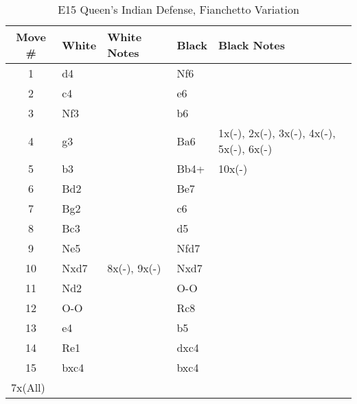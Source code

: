 \begin{table}[htbp]
\centering
\scriptsize
\caption[]{E15 Queen's Indian Defense, Fianchetto Variation}
\begin{tabular}{|c|l|p{5cm}|l|p{5cm}|}
\hline
\textbf{Move \#} & \textbf{White} & \textbf{White Notes} & \textbf{Black} & \textbf{Black Notes} \\
\hline
1  & d4    &         & Nf6   &         \\
2  & c4    &         & e6    &         \\
3  & Nf3   &         & b6    &         \\
4  & g3    &         & Ba6   & 1x(-), 2x(-), 3x(-), 4x(-), 5x(-), 6x(-) \\
5  & b3    &         & Bb4+  & 10x(-)  \\
6  & Bd2   &         & Be7   &         \\
7  & Bg2   &         & c6    &         \\
8  & Bc3   &         & d5    &         \\
9  & Ne5   &         & Nfd7  &         \\
10 & Nxd7  & 8x(-), 9x(-) & Nxd7  &         \\
11 & Nd2   &         & O-O   &         \\
12 & O-O   &         & Rc8   &         \\
13 & e4    &         & b5    &         \\
14 & Re1   &         & dxc4  &         \\
15 & bxc4  &         & bxc4  &         \\
\hline
\multicolumn{5}{|l|}{7x(All)} \\
\hline
\end{tabular}
\end{table}


